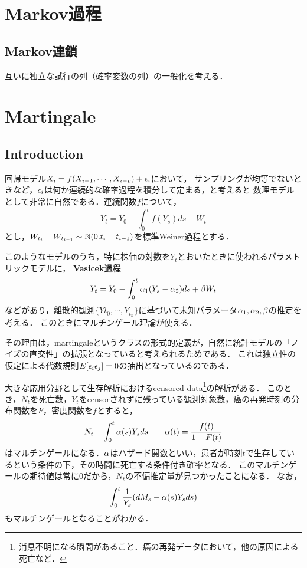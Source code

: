 \documentclass[uplatex,dvipdfmx]{jsreport}
\begin{document}
\chapter{Markov過程}

\section{Markov連鎖}

\begin{tcolorbox}[colframe=ForestGreen, colback=ForestGreen!10!white,breakable,colbacktitle=ForestGreen!40!white,coltitle=black,fonttitle=\bfseries\sffamily,
title=]
    互いに独立な試行の列（確率変数の列）の一般化を考える．
\end{tcolorbox}

\chapter{Martingale}

\section{Introduction}

回帰モデル$X_i=f(X_{i-1},\cdots,X_{i-p})+\epsilon_i$において，
サンプリングが均等でないときなど，$\epsilon_i$は何か連続的な確率過程を積分して定まる，と考えると
数理モデルとして非常に自然である．連続関数$f$について，
\[Y_t=Y_0+\int^t_0f(Y_s)ds+W_t\]
とし，$W_{t_i}-W_{t_{i-1}}\sim\mathbb{N}(0.t_i-t_{i-1})$を標準Weiner過程とする．

このようなモデルのうち，特に株価の対数を$Y_t$とおいたときに使われるパラメトリックモデルに，
\textbf{Vasicek過程}
\[Y_t=Y_0-\int^t_0\alpha_1(Y_s-\alpha_2)ds+\beta W_t\]
などがあり，離散的観測$\{Y{t_0},\cdots,Y_{t_n}\}$に基づいて未知パラメータ$\alpha_1,\alpha_2,\beta$の推定を考える．
このときにマルチンゲール理論が使える．

その理由は，martingaleというクラスの形式的定義が，自然に統計モデルの「ノイズの直交性」の拡張となっていると考えられるためである．
これは独立性の仮定による代数規則$E[\epsilon_i\epsilon_j]=0$の抽出となっているのである．

大きな応用分野として生存解析におけるcensored data\footnote{消息不明になる瞬間があること．癌の再発データにおいて，他の原因による死亡など．}の解析がある．
このとき，$N_t$を死亡数，$Y_t$をcensorされずに残っている観測対象数，癌の再発時刻の分布関数を$F$，密度関数を$f$とすると，
\[N_t-\int^t_0\alpha(s)Y_sds\qquad\alpha(t)=\frac{f(t)}{1-F(t)}\]
はマルチンゲールになる．$\alpha$はハザード関数といい，患者が時刻$t$で生存しているという条件の下，その時間に死亡する条件付き確率となる．
このマルチンゲールの期待値は常に$0$だから，$N_t$の不偏推定量が見つかったことになる．
なお，
\[\int^t_0\frac{1}{Y_s}(dM_s-\alpha(s)Y_sds)\]
もマルチンゲールとなることがわかる．
\end{document}
